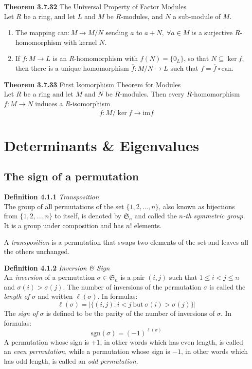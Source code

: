 \documentclass[8pt,landscape]{article}
\begin{document}
\begin{multicols}{3}
    \textbf{Theorem 3.7.32} The Universal Property of Factor Modules \\
    Let $R$ be a ring, and let $L$ and $M$ be $R$-modules, and $N$ a sub-module of $M$.
    \begin{enumerate}
        \item The mapping $\mathrm{can} : M \to M/N$ sending $a$ to
            $a+N, \ \forall a \in M$ is a surjective $R$-homomorphism with kernel $N$.
        \item If $f : M \to L$ is an $R$-homomorphism with $f(N) = \{0_L\}$,
            so that $N \subseteq \ker f$,
            then there is a unique homomorphism $\overline{f} : M/N \to L$
            such that $f = \overline{f} \circ \mathrm{can}$.
    \end{enumerate}

    \textbf{Theorem 3.7.33} First Isomorphism Theorem for Modules \\
    Let $R$ be a ring and let $M$ and $N$ be $R$-modules.
    Then every $R$-homomorphism $f : M \to N$ induces a $R$-isomorphism
    \[
        \overline{f} : M / \ker f \to \mathrm{im} f
    \]
    \section{Determinants \& Eigenvalues}

    \subsection{The sign of a permutation}

    \textbf{Definition 4.1.1} \emph{Transposition} \\
    The group of all permutations of the set $\{1,2,\ldots,n\}$, also known as
    bijections from $\{1,2,\ldots,n\}$ to itself, is denoted by $\mathfrak{S}_n$ and
    called the \emph{$n$-th symmetric group}.
    It is a group under composition and has $n$! elements.

    A \emph{transposition} is a permutation that swaps two elements of the set
    and leaves all the others unchanged.

    \textbf{Definition 4.1.2} \emph{Inversion \& Sign} \\
    An \emph{inversion} of a permutation $\sigma \in \mathfrak{S}_n$ is a pair $(i,j)$
    such that $1 \leq i < j \leq n$ and $\sigma(i) > \sigma(j)$.
    The number of inversions of the permutation $\sigma$ is called the \emph{length of}
    $\sigma$ and written $\ell(\sigma)$.
    In formulas:
    \[
        \ell(\sigma) = |\{(i,j) : i < j \ \mathrm{but} \ \sigma(i) > \sigma(j) \}|
    \]
    The \emph{sign of} $\sigma$ is defined to be the parity of the number of inversions of
    $\sigma$.
    In formulas:
    \[
        \mathrm{sgn}(\sigma) = {(-1)}^{\ell(\sigma)}
    \]
    A permutation whose sign is $+1$, in other words which has even length, is called an
    \emph{even permutation},
    while a permutation whose sign is $-1$, in other words which has odd length,
    is called an \emph{odd permutation}.


\end{multicols}
\end{document}
